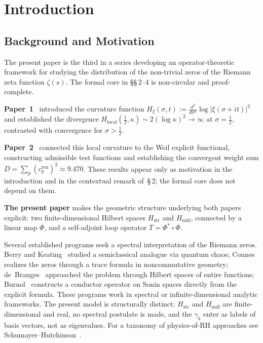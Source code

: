 \documentclass[11pt]{article}
\newcommand{\Hstr}{H_{\mathrm{str}}}
\newcommand{\Hnull}{H_{\mathrm{null}}}
\newcommand{\Hlocal}{H_{\mathrm{local}}}
\begin{document}
\newpage

\section{Introduction}

\subsection{Background and Motivation}

The present paper is the third in a series developing an
operator-theoretic framework for studying the distribution of the
non-trivial zeros of the Riemann zeta function $\zeta(s)$.
The formal core in \S\S\,2--4 is non-circular and proof-complete.

\textbf{Paper~1}~\cite{Paper1} introduced the curvature function
$H_{\xi}(\sigma,t) := \frac{d^2}{d\sigma^2}\log|\xi(\sigma+it)|^2$
and established the divergence
$\Hlocal(\tfrac12,\kappa)\sim 2(\log\kappa)^2\to\infty$ at
$\sigma=\tfrac12$, contrasted with convergence for $\sigma>\tfrac12$.

\textbf{Paper~2}~\cite{Paper2} connected this local curvature to the
Weil explicit functional, constructing admissible test functions
and establishing the convergent weight sum
$D=\sum_p(c_p^{\mathrm{ren}})^2\approx 9.470$.
These results appear only as motivation in the introduction and in the
contextual remark of~\S\,2; the formal core does not depend on them.

\textbf{The present paper} makes the geometric structure underlying
both papers explicit: two finite-dimensional Hilbert spaces $\Hstr$
and $\Hnull$, connected by a linear map $\Phi$, and a self-adjoint
loop operator $T=\Phi^*\circ\Phi$.

Several established programs seek a spectral interpretation of the
Riemann zeros. Berry and Keating~\cite{BerryKeating} studied a
semiclassical analogue via quantum chaos;
Connes~\cite{Connes} realizes the zeros through a trace formula in
noncommutative geometry;
de~Branges~\cite{deBranges} approached the problem through Hilbert
spaces of entire functions;
Burnol~\cite{BurnolForum04} constructs a conductor operator on
Sonin spaces directly from the explicit formula.
These programs work in spectral or infinite-dimensional analytic
frameworks. The present model is structurally distinct:
$H_{\mathrm{str}}$ and $H_{\mathrm{null}}$ are finite-dimensional
and real, no spectral postulate is made, and the $\gamma_k$ enter
as labels of basis vectors, not as eigenvalues.
For a taxonomy of physics-of-RH approaches see
Schumayer--Hutchinson~\cite{SchumayerHutchinson11}.
\end{document}
